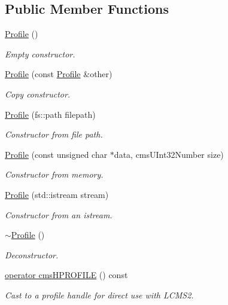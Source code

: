 \subsection*{Public Member Functions}
\begin{DoxyCompactItemize}
\item 
\hyperlink{class_c_m_s_1_1_profile_a899c56378a13a7f5920f71d88aba7772}{Profile} ()
\begin{DoxyCompactList}\small\item\em Empty constructor. \end{DoxyCompactList}\item 
\hyperlink{class_c_m_s_1_1_profile_a46a702357e409603a511d93d55d02367}{Profile} (const \hyperlink{class_c_m_s_1_1_profile}{Profile} \&other)
\begin{DoxyCompactList}\small\item\em Copy constructor. \end{DoxyCompactList}\item 
\hyperlink{class_c_m_s_1_1_profile_a53c301fecda6950999e2f87e1280cd8a}{Profile} (fs\+::path filepath)
\begin{DoxyCompactList}\small\item\em Constructor from file path. \end{DoxyCompactList}\item 
\hyperlink{class_c_m_s_1_1_profile_ad0430f199a119c916dbf6fa3c7bdff2d}{Profile} (const unsigned char $\ast$data, cms\+U\+Int32\+Number size)
\begin{DoxyCompactList}\small\item\em Constructor from memory. \end{DoxyCompactList}\item 
\hyperlink{class_c_m_s_1_1_profile_a8c587e29eb6bc30ff4f9528347334081}{Profile} (std\+::istream stream)
\begin{DoxyCompactList}\small\item\em Constructor from an istream. \end{DoxyCompactList}\item 
\hyperlink{class_c_m_s_1_1_profile_ae70df5df1fdc50817033134b958d2ab9}{$\sim$\+Profile} ()
\begin{DoxyCompactList}\small\item\em Deconstructor. \end{DoxyCompactList}\item 
\hyperlink{class_c_m_s_1_1_profile_ae7f376b982ba270728c4cf1fe340d424}{operator cms\+H\+P\+R\+O\+F\+I\+LE} () const
\begin{DoxyCompactList}\small\item\em Cast to a profile handle for direct use with L\+C\+M\+S2. \end{DoxyCompactList}\item 

\end{DoxyCompactItemize}

